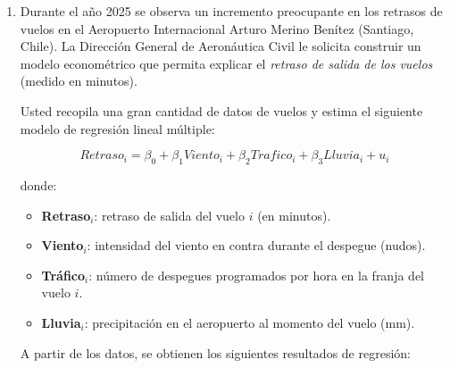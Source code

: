 \documentclass[10pt,a4paper]{article}
\begin{document}
\begin{enumerate}
   \item Durante el año 2025 se observa un incremento preocupante en los retrasos de vuelos en el Aeropuerto Internacional Arturo Merino Benítez (Santiago, Chile). La Dirección General de Aeronáutica Civil le solicita construir un modelo econométrico que permita explicar el \textit{retraso de salida de los vuelos} (medido en minutos).

Usted recopila una gran cantidad de datos de vuelos y estima el siguiente modelo de regresión lineal múltiple:

\[
Retraso_i = \beta_0 + \beta_1 Viento_i + \beta_2 Trafico_i + \beta_3 Lluvia_i + u_i
\]

donde:

\begin{itemize}
    \item \textbf{Retraso$_i$}: retraso de salida del vuelo $i$ (en minutos).
    \item \textbf{Viento$_i$}: intensidad del viento en contra durante el despegue (nudos).
    \item \textbf{Tráfico$_i$}: número de despegues programados por hora en la franja del vuelo $i$.
    \item \textbf{Lluvia$_i$}: precipitación en el aeropuerto al momento del vuelo (mm).
\end{itemize}

A partir de los datos, se obtienen los siguientes resultados de regresión:


\end{enumerate}
\end{document}
